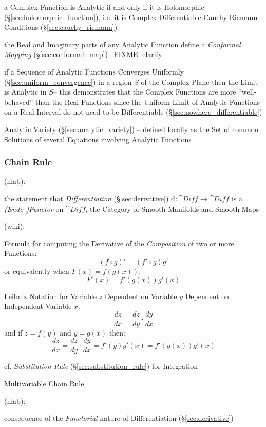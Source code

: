 a Complex Function is Analytic if and only if it is Holomorphic
(\S\ref{sec:holomorphic_function}), i.e. it is Complex Differentiable \fist
Cauchy-Riemann Conditions (\S\ref{sec:cauchy_riemann})

the Real and Imaginary parts of any Analytic Function define a \emph{Conformal
  Mapping} (\S\ref{sec:conformal_map}) --FIXME: clarify

if a Sequence of Analytic Functions Converges Uniformly
(\S\ref{sec:uniform_convergence}) in a region $S$ of the Complex Plane then the
Limit is Analytic in $S$-- this demonstrates that the Complex Functions are
more ``well-behaved'' than the Real Functions since the Uniform Limit of
Analytic Functions on a Real Interval do not need to be Differentiable
(\S\ref{sec:nowhere_differentiable})

Analytic Variety (\S\ref{sec:analytic_variety}) -- defined locally as the Set of
common Solutions of several Equations involving Analytic Functions



\subsubsection{Chain Rule}\label{sec:chain_rule}

(nlab):

the statement that \emph{Differentiation} (\S\ref{sec:derivative}) $\mathrm{d} :
\cat{Diff} \rightarrow \cat{Diff}$ is a \emph{(Endo-)Functor} on $\cat{Diff}$,
the Category of Smooth Manifolds and Smooth Maps

(wiki):

Formula for computing the Derivative of the \emph{Composition} of two or more
Functions:
\[
  (f \circ g)' = (f' \circ g) g'
\]
or equivalently when $F(x) = f(g(x))$:
\[
  F'(x) = f'(g(x))g'(x)
\]

Leibniz Notation for Variable $z$ Dependent on Variable $y$ Dependent on
Independent Variable $x$:
\[
  \frac{dz}{dx} = \frac{dz}{dy} \cdot \frac{dy}{dx}
\]
and if $z = f(y)$ and $y = g(x)$ then:
\[
  \frac{dz}{dx} = \frac{dz}{dy} \cdot \frac{dy}{dx}
    = f'(y)g'(x) = f'(g(x))g'(x)
\]

\fist cf. \emph{Substitution Rule} (\S\ref{sec:substitution_rule}) for
Integration

Multivariable Chain Rule

(nlab):

consequence of the \emph{Functorial} nature of Differentiation
(\S\ref{sec:derivative})

